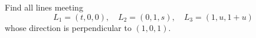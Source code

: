 Find all lines meeting
\[
L_1=(t,0,0),\quad L_2=(0,1,s),\quad L_3=(1,u,1+u)
\]
whose direction is perpendicular to $(1,0,1)$.
